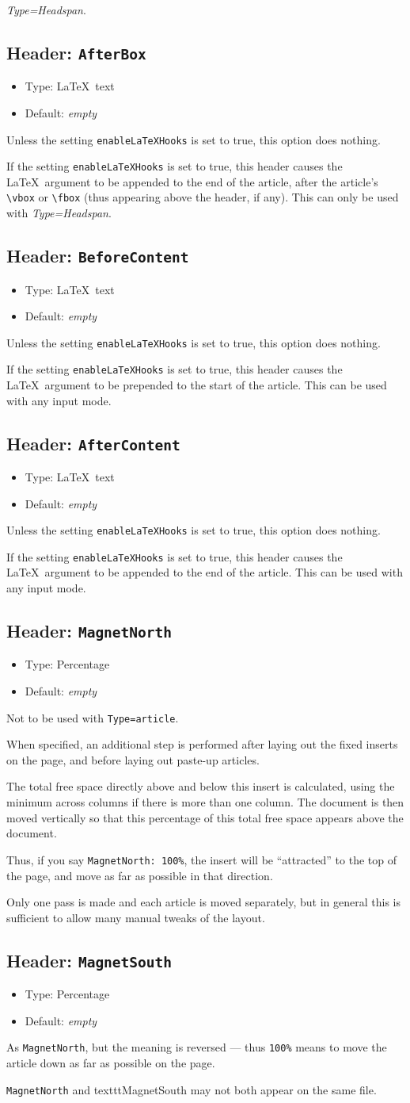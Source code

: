\documentclass[a4paper,DIV=11]{scrartcl}
\newcommand{\property}[5]{
  \subsection{#1: \texttt{#2}}
  \begin{itemize}
  \item Type: #3
  \item Default: #4
  \end{itemize}
  #5
}
\newcommand{\header}{\property{Header}}
\begin{document}
\begin{multicols}{2}
{  \textit{Type=Headspan}.
  }
\header{AfterBox}{\LaTeX\ text}{\textit{empty}}{
  Unless the setting \texttt{enableLaTeXHooks} is set to true, this
  option does nothing.\par If the setting \texttt{enableLaTeXHooks} is
  set to true, this header causes the \LaTeX\ argument to be appended
  to the end of the article, after the article's
  \texttt{\textbackslash vbox} or \texttt{\textbackslash fbox} (thus
  appearing above the header, if any). This can only be used with
  \textit{Type=Headspan}.
  }
\header{BeforeContent}{\LaTeX\ text}{\textit{empty}}{
  Unless the setting \texttt{enableLaTeXHooks} is set to true, this
  option does nothing.\par If the setting \texttt{enableLaTeXHooks} is
  set to true, this header causes the \LaTeX\ argument to be prepended
  to the start of the article. This can be used with any input mode.
}
\header{AfterContent}{\LaTeX\ text}{\textit{empty}}{
  Unless the setting \texttt{enableLaTeXHooks} is set to true, this
  option does nothing.\par If the setting \texttt{enableLaTeXHooks} is
  set to true, this header causes the \LaTeX\ argument to be appended
  to the end of the article. This can be used with any input mode.
}
\header{MagnetNorth}{Percentage}{\textit{empty}}{
  Not to be used with \texttt{Type=article}.

  When specified, an additional step is performed after laying out the
  fixed inserts on the page, and before laying out paste-up articles.

  The total free space directly above and below this insert is
  calculated, using the minimum across columns if there is more than
  one column. The document is then moved vertically so that this
  percentage of this total free space appears above the document.

  Thus, if you say \texttt{MagnetNorth: 100\%}, the insert will be
  ``attracted'' to the top of the page, and move as far as possible in
  that direction.

  Only one pass is made and each article is moved separately, but in
  general this is sufficient to allow many manual tweaks of the layout.
}
\header{MagnetSouth}{Percentage}{\textit{empty}}{ As
  \texttt{MagnetNorth}, but the meaning is reversed --- thus
  \texttt{100\%} means to move the article down as far as possible on
  the page.

  \texttt{MagnetNorth} and texttt{MagnetSouth} may not both appear on the same file.
}
\end{multicols}
\end{document}
